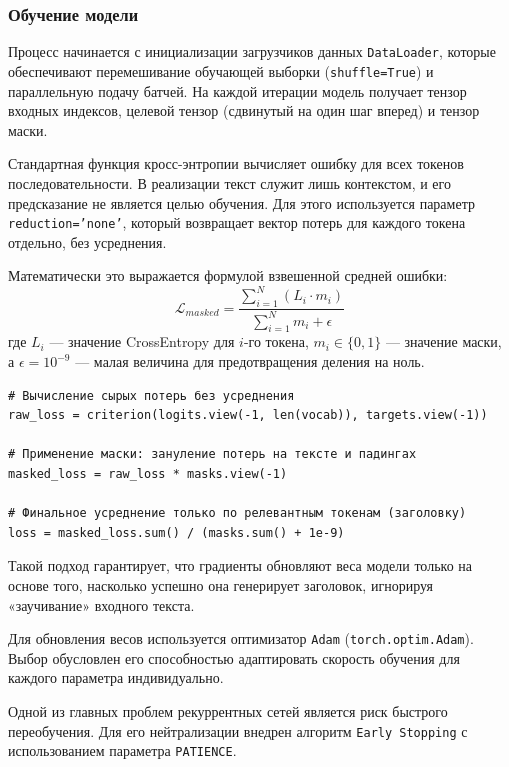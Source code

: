 \documentclass[coursework]{SCWorks}
\begin{document}
    \subsubsection{Обучение модели}

    Процесс начинается с инициализации загрузчиков данных \texttt{DataLoader},
    которые обеспечивают перемешивание обучающей выборки (\texttt{shuffle=True}) и параллельную подачу батчей.
    На каждой итерации модель получает тензор входных индексов, целевой тензор (сдвинутый на один шаг вперед) и тензор маски.

    Стандартная функция кросс-энтропии вычисляет ошибку для всех токенов последовательности.
    В реализации текст служит лишь контекстом, и его предсказание не является целью обучения.
    Для этого используется параметр \texttt{reduction='none'}, который возвращает вектор потерь для каждого токена отдельно, без усреднения.

    Математически это выражается формулой взвешенной средней ошибки:
    \[ \mathcal{L}_{masked} = \frac{\sum_{i=1}^{N} (L_i \cdot m_i)}{\sum_{i=1}^{N} m_i + \epsilon} \]
    где $L_i$ — значение CrossEntropy для $i$-го токена, $m_i \in \{0, 1\}$ — значение маски, а $\epsilon = 10^{-9}$ —
    малая величина для предотвращения деления на ноль.

    \begin{verbatim}
# Вычисление сырых потерь без усреднения
raw_loss = criterion(logits.view(-1, len(vocab)), targets.view(-1))

# Применение маски: зануление потерь на тексте и падингах
masked_loss = raw_loss * masks.view(-1)

# Финальное усреднение только по релевантным токенам (заголовку)
loss = masked_loss.sum() / (masks.sum() + 1e-9)
    \end{verbatim}

    Такой подход гарантирует, что градиенты обновляют веса модели только на основе того,
    насколько успешно она генерирует заголовок, игнорируя «заучивание» входного текста.

    Для обновления весов используется оптимизатор \texttt{Adam} (\texttt{torch.optim.Adam}).
    Выбор обусловлен его способностью адаптировать скорость обучения для каждого параметра индивидуально.

    Одной из главных проблем рекуррентных сетей является риск быстрого переобучения.
    Для его нейтрализации внедрен алгоритм \texttt{Early Stopping} с использованием параметра \texttt{PATIENCE}.
\end{document}
